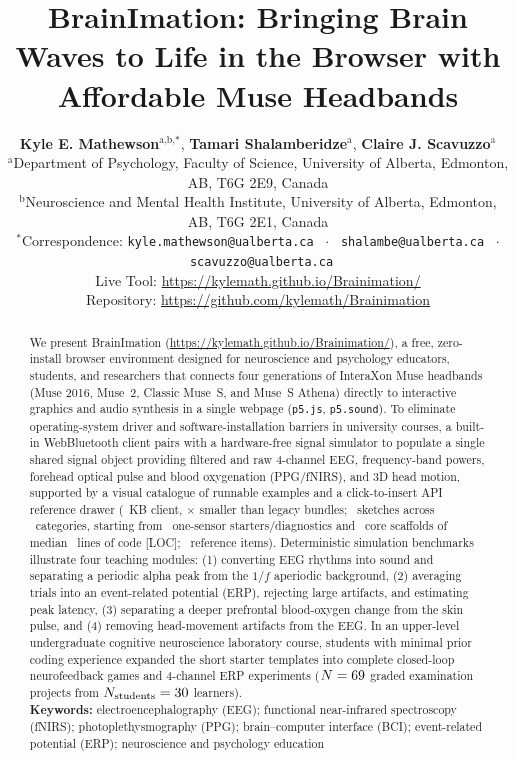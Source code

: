 \documentclass[11pt]{article}
\title{\textbf{BrainImation: Bringing Brain Waves to Life in the Browser with Affordable Muse Headbands}}
\author{
\parbox{0.94\textwidth}{\centering
\textbf{Kyle E. Mathewson}$^{\text{a,b,*}}$, \textbf{Tamari Shalamberidze}$^{\text{a}}$, \textbf{Claire J. Scavuzzo}$^{\text{a}}$\\[5pt]
\footnotesize $^{\text{a}}$Department of Psychology, Faculty of Science, University of Alberta, Edmonton, AB, T6G 2E9, Canada\\
\footnotesize $^{\text{b}}$Neuroscience and Mental Health Institute, University of Alberta, Edmonton, AB, T6G 2E1, Canada\\
\footnotesize $^*$Correspondence: \texttt{kyle.mathewson@ualberta.ca} \ $\cdot$ \ \texttt{shalambe@ualberta.ca} \ $\cdot$ \ \texttt{scavuzzo@ualberta.ca}\\
\footnotesize Live Tool: \url{https://kylemath.github.io/Brainimation/}\\
Repository: \url{https://github.com/kylemath/Brainimation}
}
}
\date{}
\begin{document}
\maketitle

\begin{abstract}
We present BrainImation (\url{https://kylemath.github.io/Brainimation/}), a free, zero-install browser environment designed for neuroscience and psychology educators, students, and researchers that connects four generations of InteraXon Muse headbands (Muse 2016, Muse~2, Classic Muse~S, and Muse~S Athena) directly to interactive graphics and audio synthesis in a single webpage (\texttt{p5.js}, \texttt{p5.sound}). To eliminate operating-system driver and software-installation barriers in university courses, a built-in WebBluetooth client pairs with a hardware-free signal simulator to populate a single shared signal object providing filtered and raw 4-channel EEG, frequency-band powers, forehead optical pulse and blood oxygenation (PPG/fNIRS), and 3D head motion, supported by a visual catalogue of runnable examples and a click-to-insert API reference drawer (\MuseBrowserKB~KB client, \BundleReductionFactor$\times$ smaller than legacy bundles; \NCatalogueSketches\ sketches across \NCatalogueCategories\ categories, starting from \NStarterDiag\ one-sensor starters/diagnostics and \NBuiltinExamples\ core scaffolds of median \ExLOCMedian\ lines of code [LOC]; \NRefAPIs\ reference items). Deterministic simulation benchmarks illustrate four teaching modules: (1) converting EEG rhythms into sound and separating a periodic alpha peak from the $1/f$ aperiodic background, (2) averaging trials into an event-related potential (ERP), rejecting large artifacts, and estimating peak latency, (3) separating a deeper prefrontal blood-oxygen change from the skin pulse, and (4) removing head-movement artifacts from the EEG. In an upper-level undergraduate cognitive neuroscience laboratory course, students with minimal prior coding experience expanded the short starter templates into complete closed-loop neurofeedback games and 4-channel ERP experiments ($N = 69$ graded examination projects from $N_{\text{students}} = 30$ learners).\\[4pt]
\noindent\textbf{Keywords:} electroencephalography (EEG); functional near-infrared spectroscopy (fNIRS); photoplethysmography (PPG); brain--computer interface (BCI); event-related potential (ERP); neuroscience and psychology education
\end{abstract}
\end{document}
